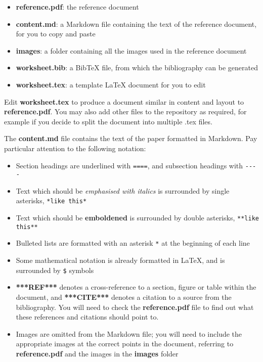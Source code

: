 \documentclass{../../../fal_assignment}
\begin{document}
\begin{itemize}
	\item \textbf{reference.pdf}: the reference document
	\item \textbf{content.md}: a Markdown file containing the text of the reference document, for you to copy and paste
	\item \textbf{images}: a folder containing all the images used in the reference document
	\item \textbf{worksheet.bib}: a BibTeX file, from which the bibliography can be generated
	\item \textbf{worksheet.tex}: a template LaTeX document for you to edit
\end{itemize}

Edit \textbf{worksheet.tex} to produce a document similar in content and layout to \textbf{reference.pdf}.
You may also add other files to the repository as required, for example if you decide to split the document into multiple .tex files.

The \textbf{content.md} file contains the text of the paper formatted in Markdown.
Pay particular attention to the following notation:

\begin{itemize}
	\item Section headings are underlined with \lstinline{====}, and subsection headings with \lstinline{----}
	\item Text which should be \emph{emphasised with italics} is surrounded by single asterisks, \lstinline{*like this*}
	\item Text which should be \textbf{emboldened} is surrounded by double asterisks, \lstinline{**like this**}
	\item Bulleted lists are formatted with an asterisk \lstinline{*} at the beginning of each line
	\item Some mathematical notation is already formatted in LaTeX, and is surrounded by \lstinline{$} symbols
	\item \textbf{***REF***} denotes a cross-reference to a section, figure or table within the document,
		and \textbf{***CITE***} denotes a citation to a source from the bibliography.
		You will need to check the \textbf{reference.pdf} file to find out what these references and citations should point to.
	\item Images are omitted from the Markdown file; you will need to include the appropriate images at the correct points in the document, referring to \textbf{reference.pdf} and the images in the \textbf{images} folder
\end{itemize}
\end{document}
